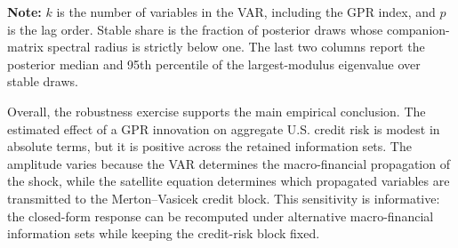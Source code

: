 \begin{table}[!htbp]
  \centering
  \scriptsize
  \tablestretch
  \compacttablecols
  \setlength{\tabcolsep}{5pt}
  \caption{\textbf{Posterior stability diagnostics for the BVAR information sets.}}
  \label{tab:var_stability_info_sets}
  \par
  \medskip
  \begin{minipage}{\textwidth}
  \footnotesize
  \noindent \textbf{Note:} $k$ is the number of variables in the VAR,
  including the GPR index, and $p$ is the lag order. Stable share is the
  fraction of posterior draws whose companion-matrix spectral radius is
  strictly below one. The last two columns report the posterior median and
  95th percentile of the largest-modulus eigenvalue over stable draws.
  \end{minipage}
\end{table}
Overall, the robustness exercise supports the main empirical conclusion. The
estimated effect of a GPR innovation on aggregate U.S. credit risk is modest
in absolute terms, but it is positive across the retained information sets.
The amplitude varies because the VAR determines the macro-financial
propagation of the shock, while the satellite equation determines which
propagated variables are transmitted to the Merton--Vasicek credit block.
This sensitivity is informative: the closed-form response can be recomputed
under alternative macro-financial information sets while keeping the
credit-risk block fixed.
